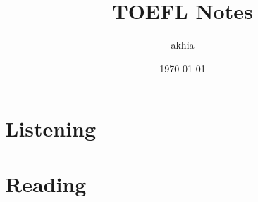 \documentclass{report}
\title{TOEFL Notes}
\author{akhia}
\date{\today}
\begin{document}
\chapter{Listening}






































\chapter{Reading}





























\end{document}
